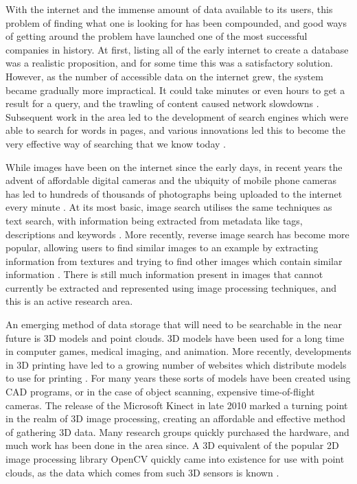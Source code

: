 \documentclass[11pt,a4paper]{kth-mag}
\begin{document}
With the internet and the immense amount of data available to its users, this
problem of finding what one is looking for has been compounded, and good ways of
getting around the problem have launched one of the most successful companies in
history. At first, listing all of the early internet to create a database was a
realistic proposition, and for some time this was a satisfactory solution.
However, as the number of accessible data on the internet grew, the system
became gradually more impractical. It could take minutes or even hours to get a
result for a query, and the trawling of content caused network slowdowns
\cite{firstsearch,archieabout,bowman1993research}. Subsequent work in the area
led to the development of search engines which were able to search for words in
pages, and various innovations led this to become the very effective way of
searching that we know today \cite{brin1998anatomy,pinkerton1994finding}.

While images have been on the internet since the early days, in recent years the
advent of affordable digital cameras and the ubiquity of mobile phone cameras
has led to hundreds of thousands of photographs being uploaded to the internet
every minute \cite{fbipo,photosminute}. At its most basic, image search utilises
the same techniques as text search, with information being extracted from
metadata like tags, descriptions and keywords \cite{jing2008pagerank}. More
recently, reverse image search has become more popular, allowing users to find
similar images to an example by extracting information from textures and trying
to find other images which contain similar information \cite{lew2006content}.
There is still much information present in images that cannot currently be
extracted and represented using image processing techniques, and this is an
active research area.

An emerging method of data storage that will need to be searchable in the near
future is 3D models and point clouds. 3D models have been used for a long time
in computer games, medical imaging, and animation. More recently, developments
in 3D printing have led to a growing number of websites which distribute models
to use for printing \cite{3dprintlist}. For many years these sorts of models
have been created using CAD programs, or in the case of object scanning,
expensive time-of-flight cameras. The release of the Microsoft Kinect in late
2010 marked a turning point in the realm of 3D image processing, creating an
affordable and effective method of gathering 3D data. Many research groups
quickly purchased the hardware, and much work has been done in the area since. A
3D equivalent of the popular 2D image processing library OpenCV quickly came
into existence for use with point clouds, as the data which comes from such 3D
sensors is known \cite{opencv, pcl}.
\end{document}
